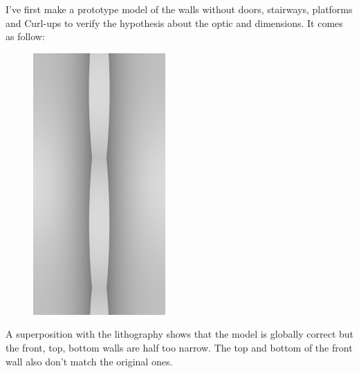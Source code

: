 \documentclass[12pt, a4paper]{article}
\begin{document}
I've first make a prototype model of the walls without doors, stairways, platforms and Curl-ups to verify the hypothesis about the optic and dimensions. It comes as follow:\\

\begin{scriptsize}
\begin{ttfamily}

\end{ttfamily}
\end{scriptsize}

\begin{center}
\begin{figure}[H]
\centering\includegraphics[height=10cm]{./XL-51_1.png}\\
\end{figure}
\end{center}

A superposition with the lithography shows that the model is globally correct but the front, top, bottom walls are half too narrow. The top and bottom of the front wall also don't match the original ones.\\
\end{document}
